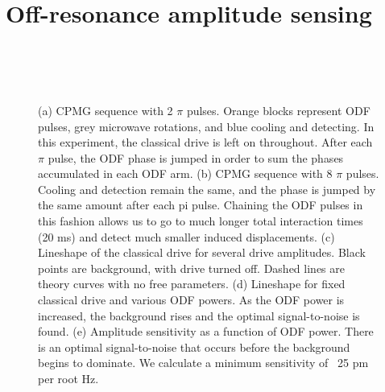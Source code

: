 \documentclass[aps,prl,twocolumn,groupedaddress]{revtex4-1}
\begin{document}
\section{Off-resonance amplitude sensing}

\begin{figure}
\centering
  \\
  \\
  \hfill
  \\
  \caption{(a) CPMG sequence with 2 $\pi$ pulses. Orange blocks represent ODF pulses, grey microwave rotations, and blue cooling and detecting. In this experiment, the classical drive is left on throughout. After each $\pi$ pulse, the ODF phase is jumped in order to sum the phases accumulated in each ODF arm. (b) CPMG sequence with 8 $\pi$ pulses. Cooling and detection remain the same, and the phase is jumped by the same amount after each pi pulse. Chaining the ODF pulses in this fashion allows us to go to much longer total interaction times (20 ms) and detect much smaller induced displacements.   (c) Lineshape of the classical drive for several drive amplitudes. Black points are background, with drive turned off. Dashed lines are theory curves with no free parameters.  (d) Lineshape for fixed classical drive and various ODF powers. As the ODF power is increased, the background rises and the optimal signal-to-noise is found. (e) Amplitude sensitivity as a function of ODF power. There is an optimal signal-to-noise that occurs before the background begins to dominate. We calculate a minimum sensitivity of ~25 pm per root Hz.}\label{fig:2}
\end{figure}
\end{document}
